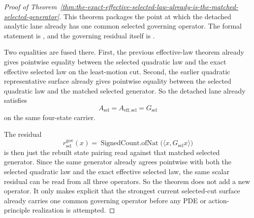 \begin{proof}[Proof of Theorem~\ref{thm:the-exact-effective-selected-law-already-is-the-matched-selected-generator}]
\label{proof:thm:the-exact-effective-selected-law-already-is-the-matched-selected-generator}
This theorem packages the point at which the detached analytic lane already
has one common selected governing operator. The formal statement is
, and
the governing residual itself is
.

Two equalities are fused there. First, the previous effective-law theorem
already gives pointwise equality between the selected quadratic law and the
exact effective selected law on the least-motion cut. Second, the earlier
quadratic representative surface already gives pointwise equality between the
selected quadratic law and the matched selected generator. So the detached
lane already satisfies
\[
A_{\mathrm{sel}} = A_{\mathrm{eff},\mathrm{sel}} = G_{\mathrm{sel}}
\]
on the same four-state carrier.

The residual
\[
r^{\mathrm{gov}}_{\mathrm{sel}}(x)=
\operatorname{SignedCount.ofNat}\!\bigl(\langle x,G_{\mathrm{sel}}x\rangle\bigr)
\]
is then just the rebuilt state pairing read against that matched selected
generator. Since the same generator already agrees pointwise with both the
selected quadratic law and the exact effective selected law, the same scalar
residual can be read from all three operators. So the theorem does not add a
new operator. It only makes explicit that the strongest current selected-cut
surface already carries one common governing operator before any PDE or
action-principle realization is attempted.
\end{proof}

